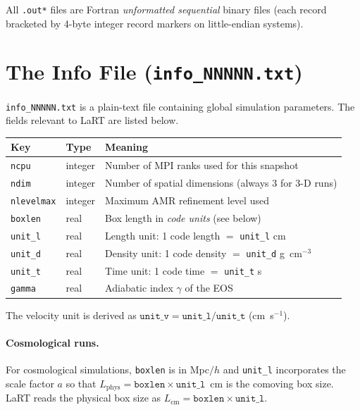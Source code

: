 \documentclass[english,a4paper]{my_memo}
\begin{document}
All \texttt{.out*} files are Fortran \emph{unformatted sequential} binary
files (each record bracketed by 4-byte integer record markers on little-endian
systems).

\section{The Info File (\texttt{info\_NNNNN.txt})}

\texttt{info\_NNNNN.txt} is a plain-text file containing global simulation
parameters.  The fields relevant to LaRT are listed below.

\begin{center}
\begin{tabular}{lll}
\toprule
Key & Type & Meaning \\
\midrule
\texttt{ncpu}    & integer & Number of MPI ranks used for this snapshot \\
\texttt{ndim}    & integer & Number of spatial dimensions (always 3 for 3-D runs)\\
\texttt{nlevelmax} & integer & Maximum AMR refinement level used \\
\texttt{boxlen}  & real & Box length in \emph{code units} (see below)\\
\texttt{unit\_l} & real & Length unit: 1 code length $=$ \texttt{unit\_l} cm \\
\texttt{unit\_d} & real & Density unit: 1 code density $=$ \texttt{unit\_d} g~cm$^{-3}$ \\
\texttt{unit\_t} & real & Time unit: 1 code time $=$ \texttt{unit\_t} s \\
\texttt{gamma}   & real & Adiabatic index $\gamma$ of the EOS \\
\bottomrule
\end{tabular}
\end{center}

The velocity unit is derived as $\texttt{unit\_v} = \texttt{unit\_l}/\texttt{unit\_t}$
(cm~s$^{-1}$).

\paragraph{Cosmological runs.}
For cosmological simulations, \texttt{boxlen} is in Mpc$/h$ and
\texttt{unit\_l} incorporates the scale factor $a$ so that
$L_\mathrm{phys} = \texttt{boxlen} \times \texttt{unit\_l}$~cm is the
comoving box size.  LaRT reads the physical box size as
$L_\mathrm{cm} = \texttt{boxlen} \times \texttt{unit\_l}$.
\end{document}
